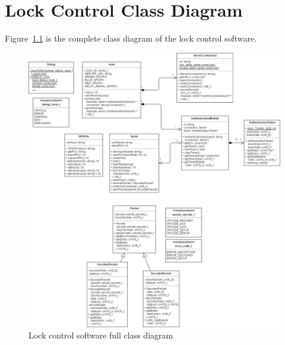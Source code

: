 \documentclass[12pt]{report}
\begin{document}
\chapter{Lock Control Class Diagram} \label{appendix:diagrams}

Figure~\ref{fig:hardware-classes-full} is the complete class diagram of the lock control software.

\begin{figure}
    \includegraphics[width=\textwidth]{Diagrams/Hardware-Diagrams/hardware_classes_full}
    \caption{Lock control software full class diagram}
    \label{fig:hardware-classes-full}
\end{figure}
\end{document}
